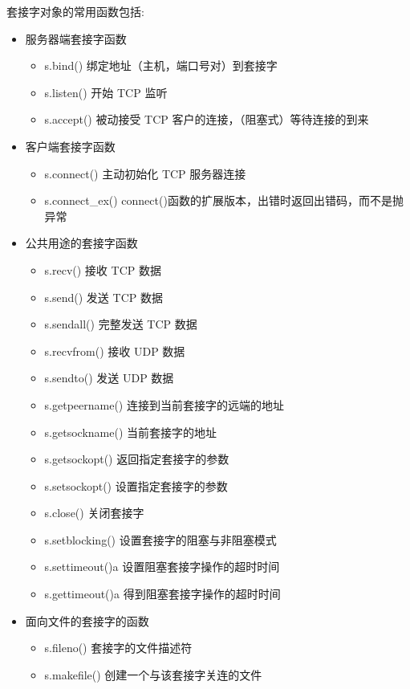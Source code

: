 \documentclass[twoside,11pt]{book}
\begin{document}
套接字对象的常用函数包括:
\begin{itemize}
  \item 服务器端套接字函数
  \begin{itemize}
    \item s.bind() 绑定地址（主机，端口号对）到套接字
    \item s.listen() 开始 TCP 监听
    \item s.accept() 被动接受 TCP 客户的连接，（阻塞式）等待连接的到来
  \end{itemize}
  \item 客户端套接字函数
  \begin{itemize}
    \item s.connect() 主动初始化 TCP 服务器连接
    \item s.connect\_ex() connect()函数的扩展版本，出错时返回出错码，而不是抛异常
  \end{itemize}
  \item 公共用途的套接字函数
  \begin{itemize}
    \item s.recv() 接收 TCP 数据
    \item s.send() 发送 TCP 数据
    \item s.sendall() 完整发送 TCP 数据
    \item s.recvfrom() 接收 UDP 数据
    \item s.sendto() 发送 UDP 数据
    \item s.getpeername() 连接到当前套接字的远端的地址
    \item s.getsockname() 当前套接字的地址
    \item s.getsockopt() 返回指定套接字的参数
    \item s.setsockopt() 设置指定套接字的参数
    \item s.close() 关闭套接字
    \item s.setblocking() 设置套接字的阻塞与非阻塞模式
    \item s.settimeout()a 设置阻塞套接字操作的超时时间
    \item s.gettimeout()a 得到阻塞套接字操作的超时时间
  \end{itemize}
  \item 面向文件的套接字的函数
  \begin{itemize}
    \item s.fileno() 套接字的文件描述符
    \item s.makefile() 创建一个与该套接字关连的文件
  \end{itemize}
\end{itemize}
\end{document}
